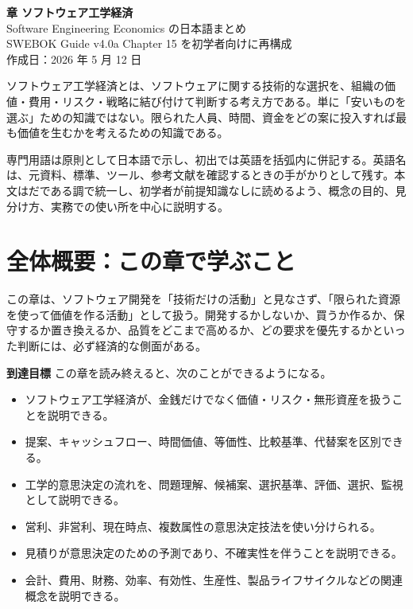 \documentclass[a4paper,11pt]{article}
\begin{document}
\begin{center}
  {\Huge\bfseries{} 章 ソフトウェア工学経済}\\[0.6em]
  {\Large Software Engineering Economics の日本語まとめ}\\[0.4em]
  {SWEBOK Guide v4.0a Chapter 15 を初学者向けに再構成}\\[0.8em]
  {作成日：2026 年 5 月 12 日}
\end{center}

\begin{claimbox}
ソフトウェア工学経済とは、ソフトウェアに関する技術的な選択を、組織の価値・費用・リスク・戦略に結び付けて判断する考え方である。単に「安いものを選ぶ」ための知識ではない。限られた人員、時間、資金をどの案に投入すれば最も価値を生むかを考えるための知識である。
\end{claimbox}

\begin{readbox}
専門用語は原則として日本語で示し、初出では英語を括弧内に併記する。英語名は、元資料、標準、ツール、参考文献を確認するときの手がかりとして残す。本文はだである調で統一し、初学者が前提知識なしに読めるよう、概念の目的、見分け方、実務での使い所を中心に説明する。
\end{readbox}

\tableofcontents
\newpage

\section*{全体概要：この章で学ぶこと}

この章は、ソフトウェア開発を「技術だけの活動」と見なさず、「限られた資源を使って価値を作る活動」として扱う。開発するかしないか、買うか作るか、保守するか置き換えるか、品質をどこまで高めるか、どの要求を優先するかといった判断には、必ず経済的な側面がある。

\textbf{到達目標} この章を読み終えると、次のことができるようになる。
\begin{itemize}
  \item ソフトウェア工学経済が、金銭だけでなく価値・リスク・無形資産を扱うことを説明できる。
  \item 提案、キャッシュフロー、時間価値、等価性、比較基準、代替案を区別できる。
  \item 工学的意思決定の流れを、問題理解、候補案、選択基準、評価、選択、監視として説明できる。
  \item 営利、非営利、現在時点、複数属性の意思決定技法を使い分けられる。
  \item 見積りが意思決定のための予測であり、不確実性を伴うことを説明できる。
  \item 会計、費用、財務、効率、有効性、生産性、製品ライフサイクルなどの関連概念を説明できる。
\end{itemize}
\end{document}
